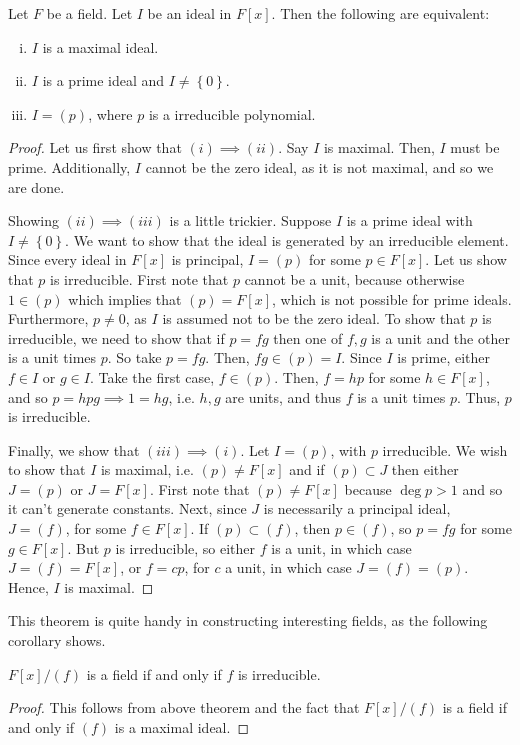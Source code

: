 \documentclass{../mathnotes}
\begin{document}
\begin{thm}
    Let $F$ be a field. Let $I$ be an ideal in $F[x]$. Then the following are equivalent:
    \begin{enumerate}[(i)]
        \item $I$ is a maximal ideal.
        \item $I$ is a prime ideal and $I\neq \left\{ 0 \right\}$.
        \item $I=(p)$, where $p$ is a irreducible polynomial.
    \end{enumerate}
\end{thm}
\begin{proof}
    Let us first show that $(i)\implies(ii)$.
    Say $I$ is maximal. Then, $I$ must be prime. Additionally, $I$ cannot be the zero ideal, as it is not
    maximal, and so we are done.

    Showing $(ii)\implies(iii)$ is a little trickier. Suppose $I$ is a prime ideal with $I\neq \left\{ 0 \right\}$.
    We want to show that the ideal is generated by an irreducible element. Since every ideal in $F[x]$ is principal,
    $I=(p)$ for some $p\in F[x]$. Let us show that $p$ is irreducible. First note that $p$ cannot be a unit, because
    otherwise $1\in(p)$ which implies that $(p)=F[x]$, which is not possible for prime ideals. Furthermore,
    $p\neq0$, as $I$ is assumed not to be the zero ideal. To show that $p$ is irreducible, we need to show that if
    $p=fg$ then one of $f,g$ is a unit and the other is a unit times $p$. So take $p=fg$. Then, $fg\in (p)=I$.
    Since $I$ is prime, either $f\in I$ or $g\in I$. Take the first case, $f\in(p)$. Then, $f=hp$ for some $h\in F[x]$,
    and so $p=hpg\implies 1=hg$, i.e. $h,g$ are units, and thus $f$ is a unit times $p$.
    Thus, $p$ is irreducible.

    Finally, we show that $(iii)\implies(i)$. Let $I=(p)$, with $p$ irreducible. We wish to show that $I$ is maximal,
    i.e. $(p)\neq F[x]$ and if $(p)\subset J$ then either $J=(p)$ or $J=F[x]$. First note that $(p)\neq F[x]$ because
    $\deg p>1$ and so it can't generate constants. Next, since $J$ is necessarily a principal ideal, $J=(f)$, for some
    $f\in F[x]$. If $(p)\subset (f)$, then $p\in(f)$, so $p=fg$ for some $g\in F[x]$. But $p$ is irreducible, so either
    $f$ is a unit, in which case $J=(f)=F[x]$, or $f=cp$, for $c$ a unit, in which case $J=(f)=(p)$. Hence, $I$ is
    maximal.
\end{proof}
This theorem is quite handy in constructing interesting fields, as the following corollary shows.
\begin{cor}
    $F[x]/(f)$ is a field if and only if $f$ is irreducible.
\end{cor}
\begin{proof}
    This follows from above theorem and the fact that $F[x]/(f)$ is a field if and only if $(f)$ is a maximal ideal.
\end{proof}
\end{document}
